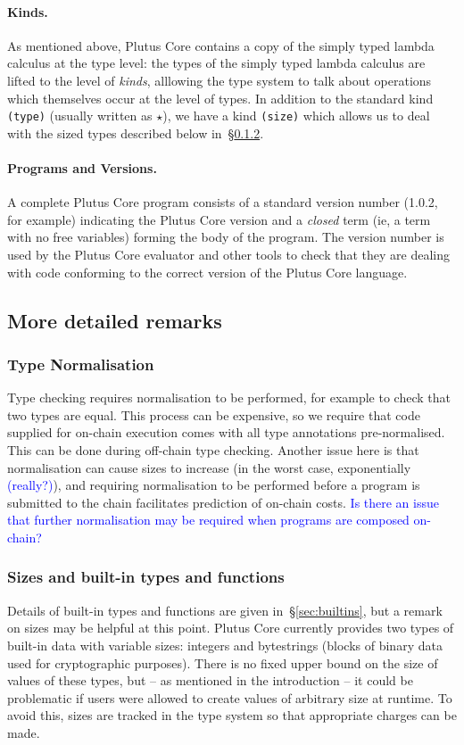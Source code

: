 \documentclass[a4paper]{article}
\newcommand{\blue}[1]{\textcolor{blue}{#1}}
\begin{document}
\paragraph{Kinds.} As mentioned above, Plutus Core contains a copy of the 
simply typed lambda calculus at the type level: the types of the
simply typed lambda calculus are lifted to the level of
\textit{kinds}, alllowing the type system to talk about operations
which themselves occur at the level of types. In addition to the
standard kind \texttt{(type)} (usually written as $\star$), we have a
kind \texttt{(size)} which allows us to deal with the sized types described 
below in~\S\ref{sec:size-note}.


\paragraph{Programs and Versions.} A complete Plutus Core program 
consists of a standard version number (1.0.2, for example) indicating
the Plutus Core version and a \textit{closed} term (ie, a term with no
free variables) forming the body of the program.  The version number
is used by the Plutus Core evaluator and other tools to check that
they are dealing with code conforming to the correct version of the
Plutus Core language.

\subsection{More detailed remarks}
\subsubsection{Type Normalisation}
 Type checking requires normalisation to be performed, for example to
 check that two types are equal.  This process can be expensive, so we
 require that code supplied for on-chain execution comes with all type
 annotations pre-normalised.  This can be done during off-chain type
 checking.  Another issue here is that normalisation can cause sizes
 to increase (in the worst case, exponentially \blue{(really?)}), and
 requiring normalisation to be performed before a program is submitted
 to the chain facilitates prediction of on-chain costs.  \blue{Is
   there an issue that further normalisation may be required when
   programs are composed on-chain?}

\subsubsection{Sizes and built-in types and functions}
\label{sec:size-note}
Details of built-in types and functions are given
in~\S\ref{sec:builtins}, but a remark on sizes may be helpful at this
point.  Plutus Core currently provides two types of built-in data with
variable sizes: integers and bytestrings (blocks of binary data used
for cryptographic purposes).  There is no fixed upper bound on the
size of values of these types, but -- as mentioned in the introduction -- it
could be problematic if users were allowed to create values of arbitrary size 
at runtime. To avoid this, sizes are tracked in the type system so that 
appropriate charges can be made. 
\end{document}
